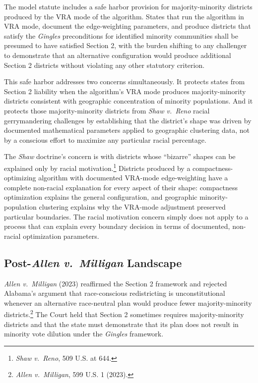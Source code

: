 The model statute includes a safe harbor provision for majority-minority districts produced by the VRA mode of the algorithm. States that run the algorithm in VRA mode, document the edge-weighting parameters, and produce districts that satisfy the \textit{Gingles} preconditions for identified minority communities shall be presumed to have satisfied Section 2, with the burden shifting to any challenger to demonstrate that an alternative configuration would produce additional Section 2 districts without violating any other statutory criterion.

This safe harbor addresses two concerns simultaneously. It protects states from Section 2 liability when the algorithm's VRA mode produces majority-minority districts consistent with geographic concentration of minority populations. And it protects those majority-minority districts from \textit{Shaw v.\ Reno} racial gerrymandering challenges by establishing that the district's shape was driven by documented mathematical parameters applied to geographic clustering data, not by a conscious effort to maximize any particular racial percentage.

The \textit{Shaw} doctrine's concern is with districts whose ``bizarre'' shapes can be explained only by racial motivation.\footnote{\textit{Shaw v.\ Reno}, 509 U.S. at 644.} Districts produced by a compactness-optimizing algorithm with documented VRA-mode edge-weighting have a complete non-racial explanation for every aspect of their shape: compactness optimization explains the general configuration, and geographic minority-population clustering explains why the VRA-mode adjustment preserved particular boundaries. The racial motivation concern simply does not apply to a process that can explain every boundary decision in terms of documented, non-racial optimization parameters.

\subsection{Post-\textit{Allen v.\ Milligan} Landscape}

\textit{Allen v.\ Milligan} (2023) reaffirmed the Section 2 framework and rejected Alabama's argument that race-conscious redistricting is unconstitutional whenever an alternative race-neutral plan would produce fewer majority-minority districts.\footnote{\textit{Allen v.\ Milligan}, 599 U.S. 1 (2023).} The Court held that Section 2 sometimes requires majority-minority districts and that the state must demonstrate that its plan does not result in minority vote dilution under the \textit{Gingles} framework.

